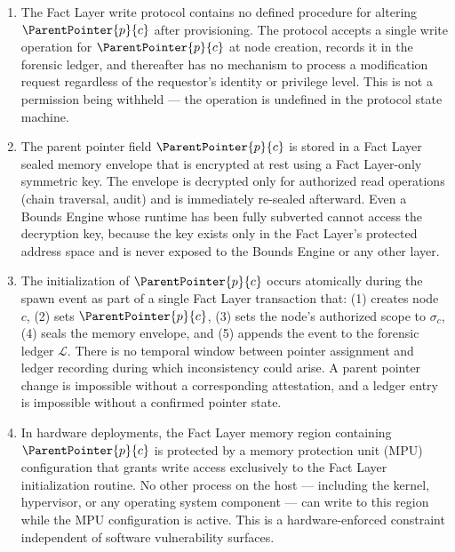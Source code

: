 \begin{enumerate}
    \item[(I1) \textbf{No modification operation defined.}] The Fact Layer write protocol contains no defined procedure for altering $\ParentPointer{p}{c}$ after provisioning. The protocol accepts a single write operation for $\ParentPointer{p}{c}$ at node creation, records it in the forensic ledger, and thereafter has no mechanism to process a modification request regardless of the requestor's identity or privilege level. This is not a permission being withheld --- the operation is undefined in the protocol state machine.

    \item[(I2) \textbf{Sealed memory envelope.}] The parent pointer field $\ParentPointer{p}{c}$ is stored in a Fact Layer sealed memory envelope that is encrypted at rest using a Fact Layer-only symmetric key. The envelope is decrypted only for authorized read operations (chain traversal, audit) and is immediately re-sealed afterward. Even a Bounds Engine whose runtime has been fully subverted cannot access the decryption key, because the key exists only in the Fact Layer's protected address space and is never exposed to the Bounds Engine or any other layer.

    \item[(I3) \textbf{Atomic provisioning write.}] The initialization of $\ParentPointer{p}{c}$ occurs atomically during the spawn event as part of a single Fact Layer transaction that: (1) creates node $c$, (2) sets $\ParentPointer{p}{c}$, (3) sets the node's authorized scope to $\sigma_c$, (4) seals the memory envelope, and (5) appends the event to the forensic ledger $\mathcal{L}$. There is no temporal window between pointer assignment and ledger recording during which inconsistency could arise. A parent pointer change is impossible without a corresponding attestation, and a ledger entry is impossible without a confirmed pointer state.

    \item[(I4) \textbf{MPU-enforced write protection.}] In hardware deployments, the Fact Layer memory region containing $\ParentPointer{p}{c}$ is protected by a memory protection unit (MPU) configuration that grants write access exclusively to the Fact Layer initialization routine. No other process on the host --- including the kernel, hypervisor, or any operating system component --- can write to this region while the MPU configuration is active. This is a hardware-enforced constraint independent of software vulnerability surfaces.
\end{enumerate}

